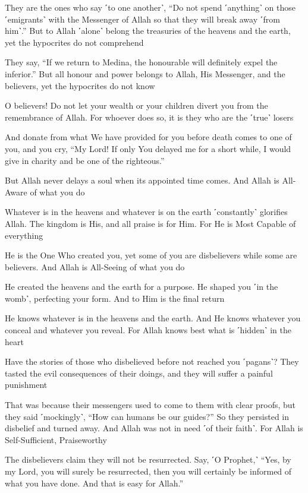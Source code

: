 They are the ones who say ˹to one another˺, “Do not spend ˹anything˺ on those ˹emigrants˺ with the Messenger of Allah so that they will break away ˹from him˺.” But to Allah ˹alone˺ belong the treasuries of the heavens and the earth, yet the hypocrites do not comprehend

They say, “If we return to Medina, the honourable will definitely expel the inferior.” But all honour and power belongs to Allah, His Messenger, and the believers, yet the hypocrites do not know

O believers! Do not let your wealth or your children divert you from the remembrance of Allah. For whoever does so, it is they who are the ˹true˺ losers

And donate from what We have provided for you before death comes to one of you, and you cry, “My Lord! If only You delayed me for a short while, I would give in charity and be one of the righteous.”

But Allah never delays a soul when its appointed time comes. And Allah is All-Aware of what you do

Whatever is in the heavens and whatever is on the earth ˹constantly˺ glorifies Allah. The kingdom is His, and all praise is for Him. For He is Most Capable of everything

He is the One Who created you, yet some of you are disbelievers while some are believers. And Allah is All-Seeing of what you do

He created the heavens and the earth for a purpose. He shaped you ˹in the womb˺, perfecting your form. And to Him is the final return

He knows whatever is in the heavens and the earth. And He knows whatever you conceal and whatever you reveal. For Allah knows best what is ˹hidden˺ in the heart

Have the stories of those who disbelieved before not reached you ˹pagans˺? They tasted the evil consequences of their doings, and they will suffer a painful punishment

That was because their messengers used to come to them with clear proofs, but they said ˹mockingly˺, “How can humans be our guides?” So they persisted in disbelief and turned away. And Allah was not in need ˹of their faith˺. For Allah is Self-Sufficient, Praiseworthy

The disbelievers claim they will not be resurrected. Say, ˹O Prophet,˺ “Yes, by my Lord, you will surely be resurrected, then you will certainly be informed of what you have done. And that is easy for Allah.”

